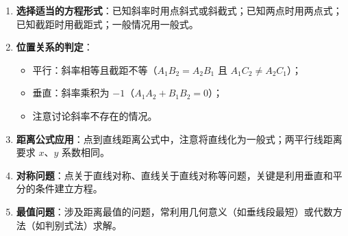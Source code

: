 \documentclass[11pt]{ctexrep}
\begin{document}
\begin{enumerate}
    \item \textbf{选择适当的方程形式}：已知斜率时用点斜式或斜截式；已知两点时用两点式；已知截距时用截距式；一般情况用一般式。
    \item \textbf{位置关系的判定}：
    \begin{itemize}
        \item 平行：斜率相等且截距不等（$A_1B_2 = A_2B_1$ 且 $A_1C_2 \neq A_2C_1$）；
        \item 垂直：斜率乘积为 $-1$（$A_1A_2 + B_1B_2 = 0$）；
        \item 注意讨论斜率不存在的情况。
    \end{itemize}
    \item \textbf{距离公式应用}：点到直线距离公式中，注意将直线化为一般式；两平行线距离要求 $x$、$y$ 系数相同。
    \item \textbf{对称问题}：点关于直线对称、直线关于直线对称等问题，关键是利用垂直和平分的条件建立方程。
    \item \textbf{最值问题}：涉及距离最值的问题，常利用几何意义（如垂线段最短）或代数方法（如判别式法）求解。
\end{enumerate}
\end{document}
